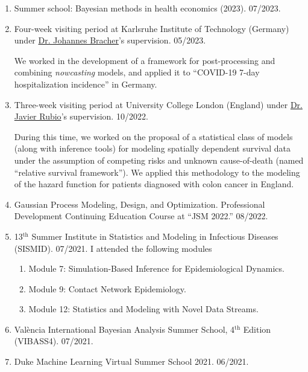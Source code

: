 \documentclass[11pt, ]{article}
\begin{document}
	\begin{enumerate}
		\item Summer school: Bayesian methods in health economics (2023).  07/2023.
		
		\item Four-week visiting period at Karlsruhe Institute of Technology (Germany) under \href{https://jbracher.github.io/}{Dr. Johannes Bracher}'s supervision. 05/2023.
		
		We worked in the development of a framework for post-processing and combining \textit{nowcasting} models, and applied it to ``COVID-19 7-day hospitalization incidence'' in Germany.
		
		\item Three-week visiting period at University College London (England) under \href{https://sites.google.com/site/fjavierrubio67/}{Dr. Javier Rubio}'s supervision. 10/2022.
		
		During this time, we worked on the proposal of a statistical class of models (along with inference tools) for modeling spatially dependent survival data under the assumption of competing risks and unknown cause-of-death (named ``relative survival framework''). We applied this methodology to the modeling of the hazard function for patients diagnosed with colon cancer in England.
		
		
		\item Gaussian Process Modeling, Design, and Optimization. Professional Development Continuing Education Course at ``JSM 2022.'' 08/2022.
		
		\item 13${}^{\text{th}}$ Summer Institute in Statistics and Modeling in Infectious Diseases (SISMID). 07/2021. I attended the following modules \vspace{-6pt}
		\begin{enumerate}[label*=\arabic*., noitemsep]
			\item Module 7: Simulation-Based Inference for Epidemiological Dynamics.
			\item Module 9: Contact Network Epidemiology.
			\item Module 12: Statistics and Modeling with Novel Data Streams.
		\end{enumerate}
		
		\item València International Bayesian Analysis Summer School, 4${}^{\text{th}}$ Edition (VIBASS4). 07/2021.
		
		\item Duke Machine Learning Virtual Summer School 2021. 06/2021.
	\end{enumerate}
	
\end{document}
